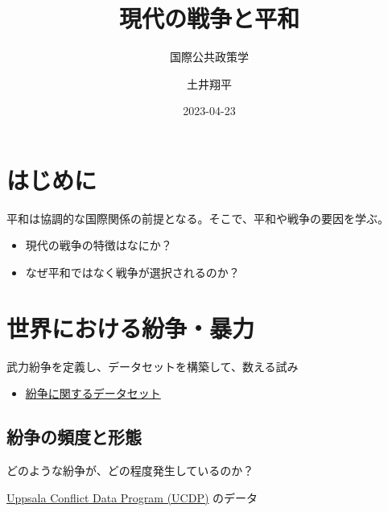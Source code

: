 \documentclass[
  xelatex,
  ja=standard]{bxjsarticle}
\title{現代の戦争と平和}
\subtitle{国際公共政策学}
\author{土井翔平}
\date{2023-04-23}
\providecommand{\tightlist}{%
  \setlength{\itemsep}{0pt}\setlength{\parskip}{0pt}}\usepackage{longtable,booktabs,array}
\begin{document}
\maketitle
\ifdefined\Shaded\renewenvironment{Shaded}{\begin{tcolorbox}[boxrule=0pt, borderline west={3pt}{0pt}{shadecolor}, sharp corners, enhanced, interior hidden, breakable, frame hidden]}{\end{tcolorbox}}\fi

\hypertarget{ux306fux3058ux3081ux306b}{%
\section*{はじめに}\label{ux306fux3058ux3081ux306b}}

平和は協調的な国際関係の前提となる。そこで、平和や戦争の要因を学ぶ。

\begin{itemize}
\tightlist
\item
  現代の戦争の特徴はなにか？
\item
  なぜ平和ではなく戦争が選択されるのか？
\end{itemize}

\hypertarget{ux4e16ux754cux306bux304aux3051ux308bux7d1bux4e89ux66b4ux529b}{%
\section{世界における紛争・暴力}\label{ux4e16ux754cux306bux304aux3051ux308bux7d1bux4e89ux66b4ux529b}}

武力紛争を定義し、データセットを構築して、数える試み\citep[序章]{tago2020}

\begin{itemize}
\tightlist
\item
  \href{https://www.cao.go.jp/pko/pko_j/organization/researcher/atpkonow/article099.html}{紛争に関するデータセット}
\end{itemize}

\hypertarget{ux7d1bux4e89ux306eux983bux5ea6ux3068ux5f62ux614b}{%
\subsection{紛争の頻度と形態}\label{ux7d1bux4e89ux306eux983bux5ea6ux3068ux5f62ux614b}}

どのような紛争が、どの程度発生しているのか？

\href{https://ucdp.uu.se/encyclopedia}{Uppsala Conflict Data Program
(UCDP)} のデータ\citep{gleditsch2002}
\end{document}
